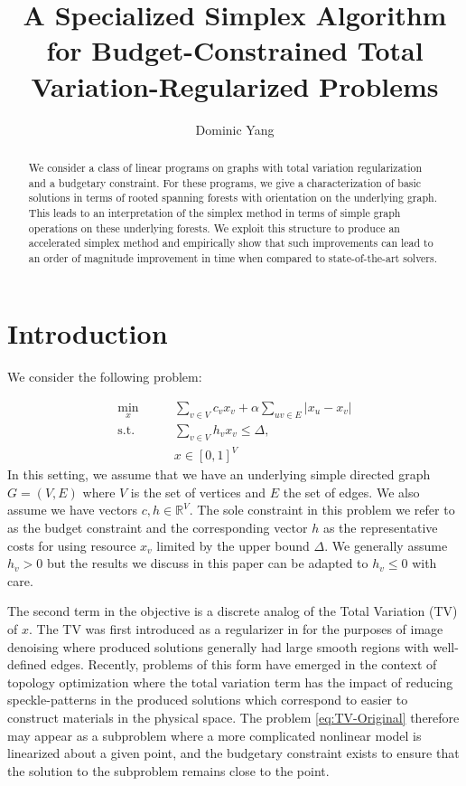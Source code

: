 \documentclass[titlepage,11pt]{article}
\title{A Specialized Simplex Algorithm for Budget-Constrained Total Variation-Regularized Problems}
\author[1]{Dominic Yang}
\affil[1]{Argonne National Laboratory, Mathematics and Computer Science Division, dominic.yang@anl.gov}
\begin{document}
\maketitle

\begin{abstract}
    We consider a class of linear programs on graphs with total variation regularization and a budgetary constraint. For these programs, we give a characterization of basic solutions in terms of rooted spanning forests with orientation on the underlying graph. This leads to an interpretation of the simplex method in terms of simple graph operations on these underlying forests. We exploit this structure to produce an accelerated simplex method and empirically show that such improvements can lead to an order of magnitude improvement in time when compared to state-of-the-art solvers.
\end{abstract}

\section{Introduction}

We consider the following problem:

\begin{equation}\label{eq:TV-Original}
\begin{aligned}
    \min_{x} \qquad &\sum_{v \in V} c_v x_v + \alpha\sum_{uv \in E}|x_u - x_v| \\
    \text{s.t.} \qquad &\sum_{v\in V}h_v x_v \le \Delta,\\
                        &x\in [0,1]^{V}
\end{aligned}
\end{equation}
In this setting, we assume that we have an underlying simple directed graph $G = (V,E)$ where $V$ is the set of vertices and $E$ the set of edges. We also assume we have vectors $c, h \in \mathbb{R}^V$. The sole constraint in this problem we refer to as the budget constraint and the corresponding vector $h$ as the representative costs for using resource $x_v$ limited by the upper bound $\Delta$. We generally assume $h_v > 0$ but the results we discuss in this paper can be adapted to $h_v \le 0$ with care.

The second term in the objective is a discrete analog of the Total Variation (TV) of $x$. The TV was first introduced as a regularizer in \cite{rudin1992nonlinear} for the purposes of image denoising where produced solutions generally had large smooth regions with well-defined edges. Recently, problems of this form have emerged in the context of topology optimization \cite{manns2024discrete} where the total variation term has the impact of reducing speckle-patterns in the produced solutions which correspond to easier to construct materials in the physical space. The problem \eqref{eq:TV-Original} therefore may appear as a subproblem where a more complicated nonlinear model is linearized about a given point, and the budgetary constraint exists to ensure that the solution to the subproblem remains close to the point.
\end{document}
